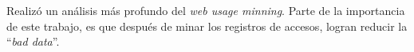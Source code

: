 Realizó un análisis más profundo del \emph{web usage minning}.
Parte de la importancia de este trabajo, es que después de minar los registros de accesos, logran reducir la ``\emph{bad data}''.
